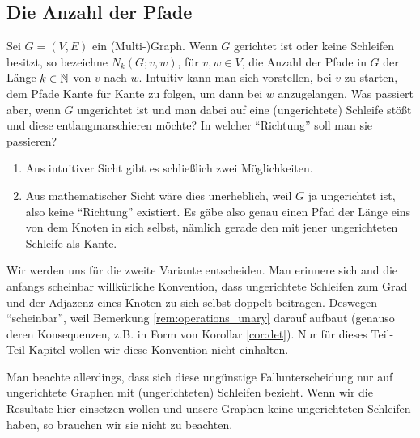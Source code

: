         \subsection{Die Anzahl der Pfade}

            Sei $G = (V, E)$ ein (Multi-)Graph.
            Wenn $G$ gerichtet ist oder keine Schleifen besitzt, so bezeichne $N_k(G; v, w)$, für $v, w \in V$, die Anzahl der Pfade in $G$ der Länge $k \in \mathbb N$ von $v$ nach $w$.
            Intuitiv kann man sich vorstellen, bei $v$ zu starten, dem Pfade Kante für Kante zu folgen, um dann bei $w$ anzugelangen.
            Was passiert aber, wenn $G$ ungerichtet ist und man dabei auf eine (ungerichtete) Schleife stößt und diese entlangmarschieren möchte?
            In welcher \enquote{Richtung} soll man sie passieren?

            \begin{enumerate}[label = \arabic*.]

                \item Aus intuitiver Sicht gibt es schließlich zwei Möglichkeiten.

                \item Aus mathematischer Sicht wäre dies unerheblich, weil $G$ ja ungerichtet ist, also keine \enquote{Richtung} existiert.
                Es gäbe also genau einen Pfad der Länge eins von dem Knoten in sich selbst, nämlich gerade den mit jener ungerichteten Schleife als Kante.

            \end{enumerate}

            Wir werden uns für die zweite Variante entscheiden.
            Man erinnere sich and die anfangs scheinbar willkürliche Konvention, dass ungerichtete Schleifen zum Grad und der Adjazenz eines Knoten zu sich selbst doppelt beitragen.
            Deswegen \enquote{scheinbar}, weil Bemerkung \ref{rem:operations_unary} darauf aufbaut (genauso deren Konsequenzen, z.B. in Form von Korollar \ref{cor:det}).
            Nur für dieses Teil-Teil-Kapitel wollen wir diese Konvention nicht einhalten.

            Man beachte allerdings, dass sich diese ungünstige Fallunterscheidung nur auf ungerichtete Graphen mit (ungerichteten) Schleifen bezieht.
            Wenn wir die Resultate hier einsetzen wollen und unsere Graphen keine ungerichteten Schleifen haben, so brauchen wir sie nicht zu beachten.

